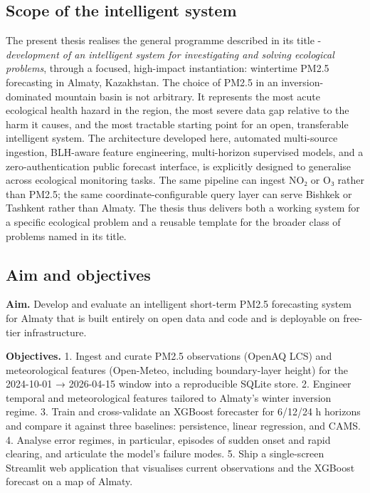 \subsection{Scope of the intelligent system}\label{scope-of-the-intelligent-system}

The present thesis realises the general programme described in its title - \emph{development of an intelligent system for investigating and solving ecological problems}, through a focused, high-impact instantiation: wintertime PM2.5 forecasting in Almaty, Kazakhstan. The choice of PM2.5 in an inversion-dominated mountain basin is not arbitrary. It represents the most acute ecological health hazard in the region, the most severe data gap relative to the harm it causes, and the most tractable starting point for an open, transferable intelligent system. The architecture developed here, automated multi-source ingestion, BLH-aware feature engineering, multi-horizon supervised models, and a zero-authentication public forecast interface, is explicitly designed to generalise across ecological monitoring tasks. The same pipeline can ingest NO₂ or O₃ rather than PM2.5; the same coordinate-configurable query layer can serve Bishkek or Tashkent rather than Almaty. The thesis thus delivers both a working system for a specific ecological problem and a reusable template for the broader class of problems named in its title.

\subsection{Aim and objectives}\label{aim-and-objectives}

\textbf{Aim.} Develop and evaluate an intelligent short-term PM2.5 forecasting system for Almaty that is built entirely on open data and code and is deployable on free-tier infrastructure.

\textbf{Objectives.} 1. Ingest and curate PM2.5 observations (OpenAQ LCS) and meteorological features (Open-Meteo, including boundary-layer height) for the 2024-10-01 → 2026-04-15 window into a reproducible SQLite store. 2. Engineer temporal and meteorological features tailored to Almaty's winter inversion regime. 3. Train and cross-validate an XGBoost forecaster for 6/12/24 h horizons and compare it against three baselines: persistence, linear regression, and CAMS. 4. Analyse error regimes, in particular, episodes of sudden onset and rapid clearing, and articulate the model's failure modes. 5. Ship a single-screen Streamlit web application that visualises current observations and the XGBoost forecast on a map of Almaty.

